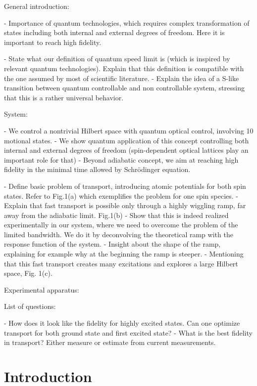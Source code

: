 \documentclass[aps,pra,reprint,a4paper,nofootinbib,superscriptaddress,numbers,longbibliography,showpacs,showkeys,floatfix]{revtex4-1}
\begin{document}
General introduction:

- Importance of quantum technologies, which requires complex transformation of states including both internal and external degrees of freedom. Here it is important to reach high fidelity.


- State what our definition of quantum speed limit is (which is inspired by relevant quantum technologies). Explain that this definition is compatible with the one assumed by most of scientific literature. 
- Explain the idea of a S-like transition between quantum controllable and non controllable system, stressing that this is a rather universal behavior.

System:

- We control a nontrivial Hilbert space with quantum optical control, involving 10 motional states.
- We show quantum application of this concept controlling both internal and external degrees of freedom (spin-dependent optical lattices play an important role for that)
- Beyond adiabatic concept, we aim at reaching high fidelity in the minimal time allowed by Schrödinger equation.


- Define basic problem of transport, introducing atomic potentials for both spin states. Refer to Fig.1(a) which exemplifies the problem for one spin species.
- Explain that fast transport is possible only through a highly wiggling ramp, far away from the adiabatic limit. Fig.1(b)
- Show that this is indeed realized experimentally in our system, where we need to overcome the problem of the limited bandwidth. We do it by deconvolving the theoretical ramp with the response function of the system.
- Insight about the shape of the ramp, explaining for example why at the beginning the ramp is steeper.
- Mentioning that this fast transport creates many excitations and explores a large Hilbert space, Fig. 1(c).


Experimental apparatus:




List of questions:

- How does it look like the fidelity for highly excited states. Can one optimize transport for both ground state and first excited state?
- What is the best fidelity in transport? Either measure or estimate from current measurements.

\section{Introduction}
\end{document}
